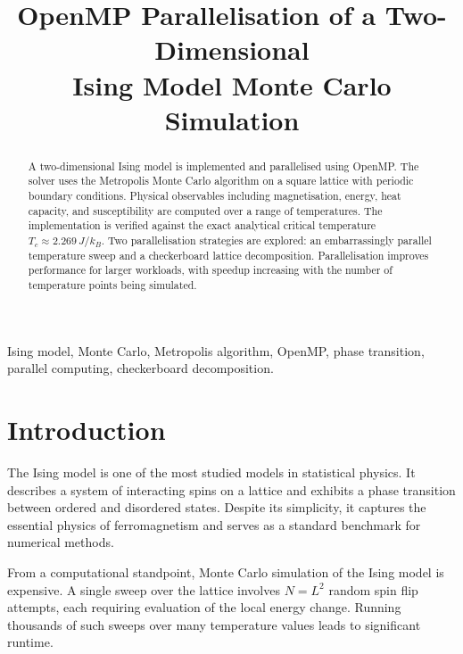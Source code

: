 \documentclass[conference]{IEEEtran}
\begin{document}
\title{OpenMP Parallelisation of a Two-Dimensional\\
Ising Model Monte Carlo Simulation}

\author{
}

\maketitle

\begin{abstract}
A two-dimensional Ising model is implemented and parallelised using OpenMP.
The solver uses the Metropolis Monte Carlo algorithm on a square lattice with
periodic boundary conditions. Physical observables including magnetisation,
energy, heat capacity, and susceptibility are computed over a range of
temperatures. The implementation is verified against the exact analytical
critical temperature $T_c \approx 2.269\,J/k_B$. Two parallelisation
strategies are explored: an embarrassingly parallel temperature sweep and a
checkerboard lattice decomposition. Parallelisation improves performance for
larger workloads, with speedup increasing with the number of temperature
points being simulated.
\end{abstract}

\begin{IEEEkeywords}
Ising model, Monte Carlo, Metropolis algorithm, OpenMP, phase transition,
parallel computing, checkerboard decomposition.
\end{IEEEkeywords}

\section{Introduction}

The Ising model is one of the most studied models in statistical physics.
It describes a system of interacting spins on a lattice and exhibits a
phase transition between ordered and disordered states. Despite its
simplicity, it captures the essential physics of ferromagnetism and
serves as a standard benchmark for numerical methods.

From a computational standpoint, Monte Carlo simulation of the Ising model
is expensive. A single sweep over the lattice involves $N = L^2$ random
spin flip attempts, each requiring evaluation of the local energy change.
Running thousands of such sweeps over many temperature values leads to
significant runtime.
\end{document}
